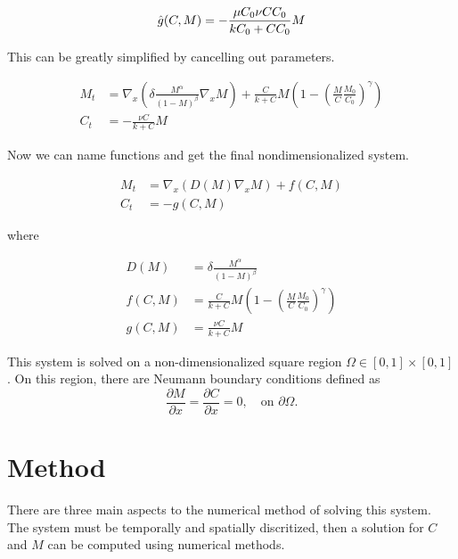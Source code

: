 \documentclass{llncs}
\begin{document}
  \begin{equation}
    \hat{g}({C},M) = -\frac{{\mu C_0 \nu} {C C_0}}{{k C_0} + {C C_0}} M \\
  \end{equation}
  
  This can be greatly simplified by cancelling out parameters.
  
  \begin{align}
    M_t &= \nabla_x \left( {\delta} \frac{M^\alpha}{(1-M)^\beta} \nabla_x M\right) + \frac{ C }{{k } + {C}} M \left(1 - \left( \frac{M}{{C}} \frac{M_0}{C_0} \right)^\gamma \right) \\
    C_t &= - \frac{\nu C}{k + C} M
  \end{align}
  
  Now we can name functions and get the final nondimensionalized system.
  
  \begin{align} \label{equ:model_system}
    M_t &= \nabla_x \left( D(M) \nabla_x M \right) + f(C,M) \\
    C_t &= - g(C,M) 
  \end{align}
  
  where
  
  \begin{equation}
  \begin{aligned} \label{equ:model_functions}
    D(M) &= \delta \frac{M^\alpha}{(1 - M)^\beta} \\
    f(C,M) &= \frac{ C }{{k } + {C}} M \left(1 - \left( \frac{M}{{C}} \frac{M_0}{C_0} \right)^\gamma \right) \\
    g(C,M) &= \frac{\nu C}{k +C} M
  \end{aligned}
  \end{equation}
  

  This system is solved on a non-dimensionalized square region $\Omega \in \left[0,1 \right] \times \left[0,1 \right]$.
  On this region, there are Neumann boundary conditions defined as
  \begin{equation}
    \frac{\partial M}{\partial x} = \frac{\partial C}{\partial x} = 0, \quad \text{on } \partial\Omega. 
  \end{equation}

\section{Method}
  There are three main aspects to the numerical method of solving this system.
  The system must be temporally and spatially discritized, then a solution for $C$ and $M$ can be computed using numerical methods.
 
\end{document}
